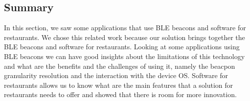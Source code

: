\subsection{Summary}
\label{sub:summary}
In this section, we saw some applications that use BLE beacons and software
for restaurants. We chose this related work because our solution
brings together the BLE beacons and software for restaurants.
Looking at some applications using BLE beacons we can have good insights
about the limitations of this technology and what are the benefits and
the challenges of using it,
namely the beacpon granularity resolution and the interaction with the
device OS.
Software for restaurants allows us to know what are the main features
that a solution for restaurants needs to offer
and showed that there is room for more innovation.
